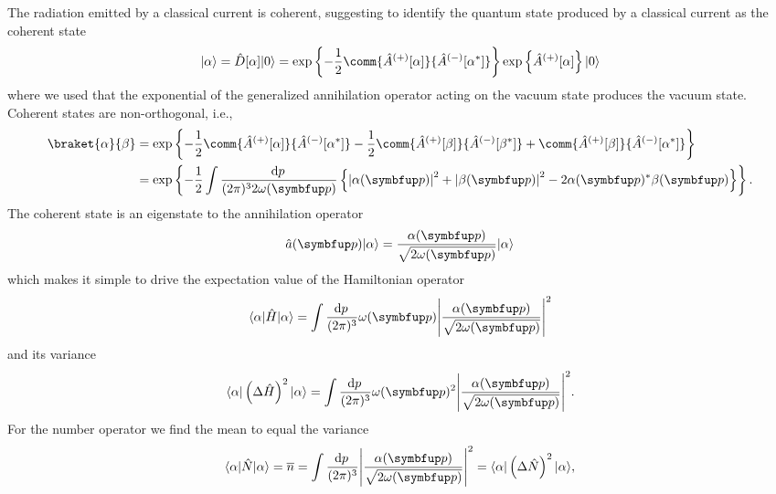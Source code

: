 The radiation emitted by a classical current is coherent, suggesting to identify the quantum state produced by a classical current as the coherent state
\begin{equation}
	\ket{\alpha}
	=
	\hat{D}[\alpha]
	\ket{0}
	=
	\exp\left\{
		-
		\frac{1}{2}
		\comm{\hat{A}^{(+)}[\alpha]}{\hat{A}^{(-)}[\alpha^*]}
	\right\}
	\exp\left\{
		\hat{A}^{(+)}[\alpha]
	\right\}
	\ket{0}
\end{equation}
where we used that the exponential of the generalized annihilation operator acting on the vacuum state produces the vacuum state.
Coherent states are non-orthogonal, i.e.,
\begin{equation}
	\begin{split}
		\braket{\alpha}{\beta}
		&=
		\exp\left\{
			-
			\frac{1}{2}
			\comm{\hat{A}^{(+)}[\alpha]}{\hat{A}^{(-)}[\alpha^*]}
			-
			\frac{1}{2}
			\comm{\hat{A}^{(+)}[\beta]}{\hat{A}^{(-)}[\beta^*]}
			+
			\comm{\hat{A}^{(+)}[\beta]}{\hat{A}^{(-)}[\alpha^*]}
		\right\}
		\\
		&=
		\exp\left\{
			-
			\frac{1}{2}
			\int\frac{\dd{p}}{(2\pi)^32\omega(\vb{p})}
			\left\{
				\abs*{\alpha(\vb{p})}^2
				+
				\abs*{\beta(\vb{p})}^2
				-
				2\alpha(\vb{p})^*\beta(\vb{p})
			\right\}
		\right\}
		.
	\end{split}
\end{equation}
The coherent state is an eigenstate to the annihilation operator
\begin{equation}
	\hat{a}(\vb{p})
	\ket{\alpha}
	=
	\frac{\alpha(\vb{p})}{\sqrt{2\omega(\vb{p})}}
	\ket{\alpha}
\end{equation}
which makes it simple to drive the expectation value of the Hamiltonian operator
\begin{equation}
	\bra{\alpha}
	\hat{H}
	\ket{\alpha}
	=
	\int\frac{\dd{p}}{(2\pi)^3}
	\omega(\vb{p})
	\abs*{\frac{\alpha(\vb{p})}{\sqrt{2\omega(\vb{p})}}}^2
\end{equation}
and its variance
\begin{equation}
	\bra{\alpha}
	\left(
		\Delta
		\hat{H}
	\right)^2
	\ket{\alpha}
	=
	\int\frac{\dd{p}}{(2\pi)^3}
	\omega(\vb{p})^2
	\abs*{\frac{\alpha(\vb{p})}{\sqrt{2\omega(\vb{p})}}}^2
	.
\end{equation}
For the number operator we find the mean to equal the variance
\begin{equation}
	\bra{\alpha}
	\hat{N}
	\ket{\alpha}
	=
	\overline{n}
	=
	\int\frac{\dd{p}}{(2\pi)^3}
	\abs*{\frac{\alpha(\vb{p})}{\sqrt{2\omega(\vb{p})}}}^2
	=
	\bra{\alpha}
	\left(
		\Delta
		\hat{N}
	\right)^2
	\ket{\alpha}
	,
\end{equation}

